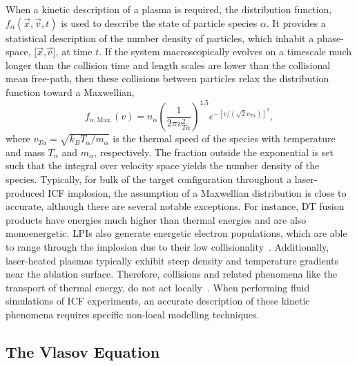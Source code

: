 When a kinetic description of a plasma is required, the distribution function, $f_{\alpha}(\vec{x},\vec{v},t)$ is used to describe the state of particle species $\alpha$.
It provides a statistical description of the number density of particles, which inhabit a phase-space, $[\vec{x}$,$\vec{v}]$, at time $t$.
If the system macroscopically evolves on a timescale much longer than the collision time and length scales are lower than the collisional mean free-path, then these collisions between particles relax the distribution function toward a Maxwellian,
\begin{equation}
    \label{eq:theory_maxwellian}
    f_{\alpha,\text{Max.}}(v) = n_{\alpha} {\left( \frac{1}{2\pi v_{T\alpha}^2} \right)}^{1.5} e^{-\left [ v/ \left (\sqrt{2} v_{T\alpha} \right ) \right ]^2},
\end{equation}
where $v_{T\alpha}=\sqrt{k_B T_{\alpha}/m_{\alpha}}$ is the thermal speed of the species with temperature and mass $T_{\alpha}$ and $m_{\alpha}$, respectively.
The fraction outside the exponential is set such that the integral over velocity space yields the number density of the species.
Typically, for bulk of the target configuration throughout a laser-produced \ac{ICF} implosion, the assumption of a Maxwellian distribution is close to accurate, although there are several notable exceptions.
For instance, DT fusion products have energies much higher than thermal energies and are also monoenergetic.
\ac{LPIs} also generate energetic electron populations, which are able to range through the implosion due to their low collisionality~\cite{barlow_role_2022}.
Additionally, laser-heated plasmas typically exhibit steep density and temperature gradients near the ablation surface.
Therefore, collisions and related phenomena like the transport of thermal energy, do not act locally~\cite{epperlein_practical_1991}.
When performing fluid simulations of \ac{ICF} experiments, an accurate description of these kinetic phenomena requires specific non-local modelling techniques.

\subsection{The Vlasov Equation}%
\label{sec:theory_vlasov}

